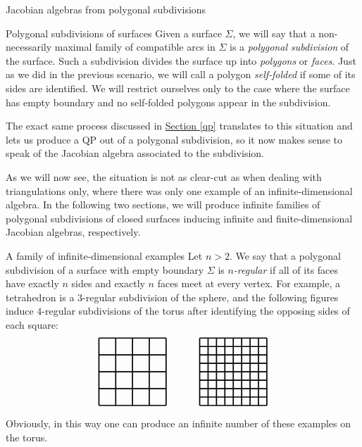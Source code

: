 \begin{chapter}{Jacobian algebras from polygonal subdivisions}
\begin{section}{Polygonal subdivisions of surfaces}
Given a surface $\Sigma$, we will say that a non-necessarily maximal family of compatible arcs in $\Sigma$ is a \emph{polygonal subdivision} of the surface. Such a subdivision divides the surface up into \emph{polygons} or \emph{faces}. Just as we did in the previous scenario, we will call a polygon \emph{self-folded} if some of its sides are identified. We will restrict ourselves only to the case where the surface has empty boundary and no self-folded polygons appear in the subdivision.

The exact same process discussed in \hyperref[qp]{Section \ref*{qp}} translates to this situation and lets us produce a QP out of a polygonal subdivision, so it now makes sense to speak of the Jacobian algebra associated to the subdivision.

As we will now see, the situation is not as clear-cut as when dealing with triangulations only, where there was only one example of an infinite-dimensional algebra. In the following two sections, we will produce infinite families of polygonal subdivisions of closed surfaces inducing infinite and finite-dimensional Jacobian algebras, respectively.
\end{section}

\begin{section}{A family of infinite-dimensional examples}
Let $n>2$. We say that a polygonal subdivision of a surface with empty boundary $\Sigma$ is \emph{$n$-regular} if all of its faces have exactly $n$ sides and exactly $n$ faces meet at every vertex. For example, a tetrahedron is a $3$-regular subdivision of the sphere, and the following figures induce $4$-regular subdivisions of the torus after identifying the opposing sides of each square:
\[
\begin{tikzpicture}[scale=1.2, very thick]
\Square{0}{0}
\Square{3}{0}

\foreach \x in {-0.5,0,0.5}
{
\draw (\x, -1) to (\x, 1);
\draw (-1, \x) to (1, \x);
}

\foreach \x in {-0.75,-0.5, ..., 0.75}
{
\draw (3+\x, -1) to (3+\x, 1);
\draw (2, \x) to (4, \x);
}
\end{tikzpicture}
\]
Obviously, in this way one can produce an infinite number of these examples on the torus.


\end{section}
\end{chapter}
